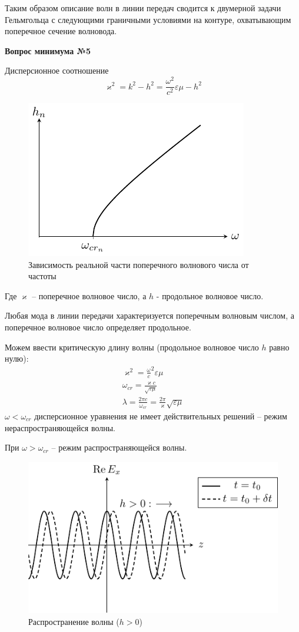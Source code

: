 \documentclass[a4paper,14pt]{extarticle}
\renewcommand{\epsilon}{\varepsilon}
\renewcommand{\kappa}{\varkappa}
\newcommand{\ticket}[1] {
\newpage
\hypertarget{num#1}{}
\begin{center}
	\textbf{Вопрос минимума №#1 }
\end{center}
}
\begin{document}
	Таким образом описание волн в линии передач сводится к двумерной задачи Гельмгольца с следующими граничными условиями на контуре, охватывающим поперечное сечение волновода.
	
\ticket{5}
	Дисперсионное соотношение 
\begin{equation}
	\kappa^2 = k^2 - h^2 = \frac{\omega^2}{c^2}\epsilon\mu - h^2
\end{equation}
	\begin{figure}[h!]
		\centering
		\includegraphics[scale=1.6]{img/lect2_ris6}
		\caption{Зависимость реальной части поперечного волнового числа от частоты}
		\label{fig:wavegain:5}
	\end{figure}
	Где $\kappa$ -- поперечное волновое число, а $h$ - продольное волновое число. 
	
Любая мода в линии передачи характеризуется поперечным волновым числом, а поперечное волновое число определяет продольное.

Можем ввести критическую длину волны (продольное волновое число $h$ равно нулю):
\begin{gather*}
\kappa^2 = {\frac{\omega}{c}}^2 {\epsilon \mu}\\
\omega_{cr} = \frac{\kappa c}{\sqrt{\epsilon \mu}}\\
\lambda = \frac{2 \pi c}{\omega_{cr}} = \frac{2 \pi}{\kappa} \sqrt{\epsilon \mu}
\end{gather*}
$\omega < \omega_{cr}$ дисперсионное уравнения не имеет действительных решений -- режим нераспространяющейся волны. 

При  $\omega > \omega_{cr}$ -- режим распространяющейся волны.


\begin{figure}[h!]
	\centering
	\includegraphics[scale=1]{img/lect3_ris1}
	\caption{Распространение волны ($h>0$)}
	\label{fig:lect3:1}
\end{figure}
\end{document}
